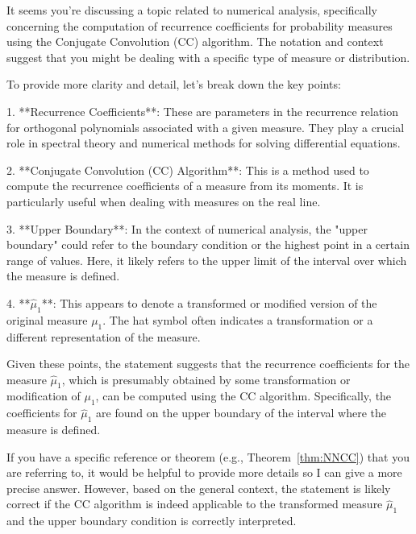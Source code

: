It seems you're discussing a topic related to numerical analysis, specifically concerning the computation of recurrence coefficients for probability measures using the Conjugate Convolution (CC) algorithm. The notation and context suggest that you might be dealing with a specific type of measure or distribution.

To provide more clarity and detail, let's break down the key points:

1. **Recurrence Coefficients**: These are parameters in the recurrence relation for orthogonal polynomials associated with a given measure. They play a crucial role in spectral theory and numerical methods for solving differential equations.

2. **Conjugate Convolution (CC) Algorithm**: This is a method used to compute the recurrence coefficients of a measure from its moments. It is particularly useful when dealing with measures on the real line.

3. **Upper Boundary**: In the context of numerical analysis, the "upper boundary" could refer to the boundary condition or the highest point in a certain range of values. Here, it likely refers to the upper limit of the interval over which the measure is defined.

4. **${\widehat{\mu}}_1$**: This appears to denote a transformed or modified version of the original measure $\mu_1$. The hat symbol often indicates a transformation or a different representation of the measure.

Given these points, the statement suggests that the recurrence coefficients for the measure ${\widehat{\mu}}_1$, which is presumably obtained by some transformation or modification of $\mu_1$, can be computed using the CC algorithm. Specifically, the coefficients for ${\widehat{\mu}}_1$ are found on the upper boundary of the interval where the measure is defined.

If you have a specific reference or theorem (e.g., Theorem~\ref{thm:NNCC}) that you are referring to, it would be helpful to provide more details so I can give a more precise answer. However, based on the general context, the statement is likely correct if the CC algorithm is indeed applicable to the transformed measure ${\widehat{\mu}}_1$ and the upper boundary condition is correctly interpreted.